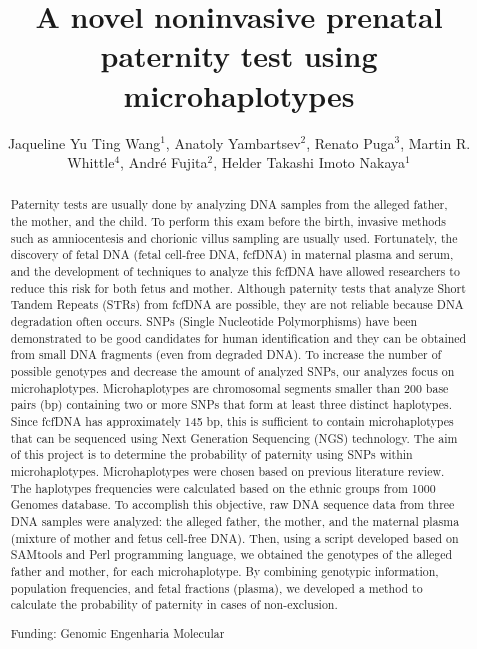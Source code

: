 \documentclass[twoside]{article}
\title{\vspace{-15mm}\fontsize{24pt}{10pt}\selectfont\textbf{A novel noninvasive prenatal paternity test using microhaplotypes}} %
\author{Jaqueline Yu Ting Wang$^1$, Anatoly Yambartsev$^2$, Renato Puga$^3$, Martin R. Whittle$^4$, Andr\'e Fujita$^2$, Helder Takashi Imoto Nakaya$^1$}
\affil{1 USP\\ 2 INSTITUTE OF MATHEMATICS AND STATISTICS - USP\\ 3 HOSPITAL ISRAELITA ALBERT EINSTEIN\\ 4 GENOMIC ENGENHARIA MOLECULAR\\ }
\date{}
\begin{document}
\maketitle %

\thispagestyle{fancy} %


\begin{abstract}
Paternity tests are usually done by analyzing DNA samples from the alleged father, the mother, and the child. To perform this exam before the birth, invasive methods such as amniocentesis and chorionic villus sampling are usually used. Fortunately, the discovery of fetal DNA (fetal cell-free DNA, fcfDNA) in maternal plasma and serum, and the development of techniques to analyze this fcfDNA have allowed researchers to reduce this risk for both fetus and mother. Although paternity tests that analyze Short Tandem Repeats (STRs) from fcfDNA are possible, they are not reliable because DNA degradation often occurs. SNPs (Single Nucleotide Polymorphisms) have been demonstrated to be good candidates for human identification and they can be obtained from small DNA fragments (even from degraded DNA). To increase the number of possible genotypes and decrease the amount of analyzed SNPs, our analyzes focus on microhaplotypes. Microhaplotypes are chromosomal segments smaller than 200 base pairs (bp) containing two or more SNPs that form at least three distinct haplotypes. Since fcfDNA has approximately 145 bp, this is sufficient to contain microhaplotypes that can be sequenced using Next Generation Sequencing (NGS) technology. The aim of this project is to determine the probability of paternity using SNPs within microhaplotypes. Microhaplotypes were chosen based on previous literature review. The haplotypes frequencies were calculated based on the ethnic groups from 1000 Genomes database. To accomplish this objective, raw DNA sequence data from three DNA samples were analyzed: the alleged father, the mother, and the maternal plasma (mixture of mother and fetus cell-free DNA). Then, using a script developed based on SAMtools and Perl programming language, we obtained the genotypes of the alleged father and mother, for each microhaplotype. By combining genotypic information, population frequencies, and fetal fractions (plasma), we developed a method to calculate the probability of paternity in cases of non-exclusion.

Funding: Genomic Engenharia Molecular
\end{abstract}
\end{document}
